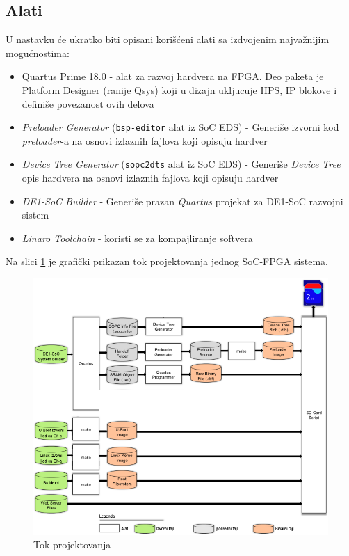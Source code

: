 \subsection{Alati}
U nastavku će ukratko biti opisani korišćeni alati sa izdvojenim najvažnijim mogućnostima:
\begin{itemize}
\item Quartus Prime 18.0 - alat za razvoj hardvera na FPGA. Deo paketa je Platform Designer (ranije Qsys) koji u dizajn ukljucuje HPS, IP blokove i definiše povezanost ovih delova
\item \textit{Preloader Generator} (\texttt{bsp-editor} alat iz SoC EDS) - Generiše izvorni kod \textit{preloader}-a na osnovi izlaznih fajlova koji opisuju hardver
\item \textit{Device Tree Generator} (\texttt{sopc2dts} alat iz SoC EDS) - Generiše \textit{Device Tree} opis hardvera na osnovi izlaznih fajlova koji opisuju hardver
\item \textit{DE1-SoC Builder} - Generiše prazan \textit{Quartus} projekat za DE1-SoC razvojni sistem
\item \textit{Linaro Toolchain} - koristi se za kompajliranje softvera
\end{itemize}

Na slici \ref{slika1:gsrd} je grafički prikazan tok projektovanja jednog SoC-FPGA sistema.

\begin{figure}[h!]
\centering
\includegraphics[scale=1.3]{img/gsrd-flow.png}
\caption{Tok projektovanja}
\label{slika1:gsrd}
\end{figure}

